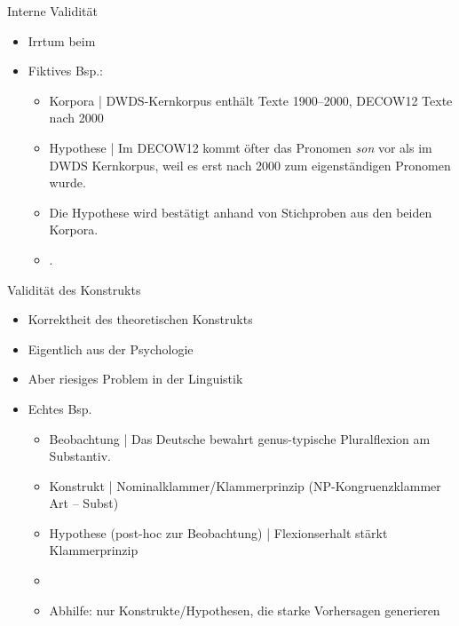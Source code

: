 \begin{frame}
  {Interne Validität}
  \begin{itemize}[<+->]
    \item Irrtum beim 
    \Zeile
    \item Fiktives Bsp.:
     \Halbzeile 
      \begin{itemize}[<+->]
        \item Korpora | DWDS-Kernkorpus enthält Texte 1900--2000, DECOW12 Texte nach 2000
          \Viertelzeile
	\item Hypothese | Im DECOW12 kommt öfter das Pronomen \textit{son} vor als im\\
          DWDS Kernkorpus, weil es erst nach 2000 zum eigenständigen Pronomen wurde.
          \Viertelzeile
	\item Die Hypothese wird bestätigt anhand von Stichproben aus den beiden Korpora.
          \Viertelzeile
        \item {}.
      \end{itemize}
  \end{itemize}
\end{frame}

\begin{frame}
  {Validität des Konstrukts}
  \begin{itemize}[<+->]
    \item Korrektheit des \alert{theoretischen Konstrukts}
      \Zeile
    \item Eigentlich aus der Psychologie
    \item Aber riesiges Problem in der Linguistik
      \Zeile
    \item Echtes Bsp.
      \Viertelzeile
      \begin{itemize}
	\item Beobachtung | Das Deutsche bewahrt genus-typische Pluralflexion am Substantiv.
	\item Konstrukt | Nominalklammer\slash Klammerprinzip (NP-Kongruenzklammer Art -- Subst)\\
	\item Hypothese (post-hoc zur Beobachtung) | Flexionserhalt stärkt Klammerprinzip
          \Halbzeile
	\item {}
         \Halbzeile 
	\item \alert{Abhilfe: nur Konstrukte\slash Hypothesen, die starke Vorhersagen generieren}
      \end{itemize}
  \end{itemize}
\end{frame}

